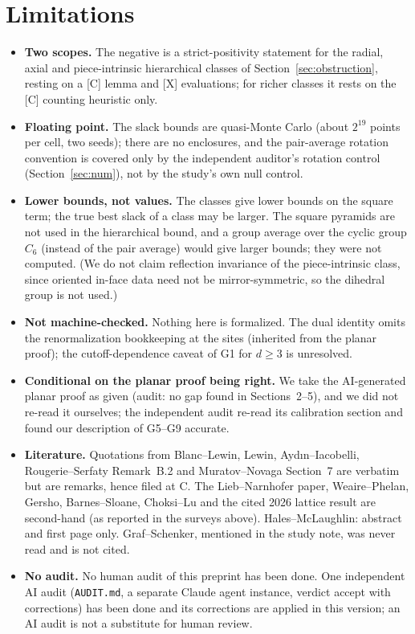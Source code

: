 \documentclass[10pt]{article}
\newcommand{\tier}[1]{\textsf{[#1]}}
\theoremstyle{remark}
\begin{document}
\section{Limitations}
\begin{itemize}
\item \textbf{Two scopes.} The negative is a strict-positivity statement for the radial, axial and piece-intrinsic hierarchical classes of Section~\ref{sec:obstruction}, resting on a \tier{C} lemma and \tier{X} evaluations; for richer classes it rests on the \tier{C} counting heuristic only.
\item \textbf{Floating point.} The slack bounds are quasi-Monte Carlo (about $2^{19}$ points per cell, two seeds); there are no enclosures, and the pair-average rotation convention is covered only by the independent auditor's rotation control (Section~\ref{sec:num}), not by the study's own null control.
\item \textbf{Lower bounds, not values.} The classes give lower bounds on the square term; the true best slack of a class may be larger. The square pyramids are not used in the hierarchical bound, and a group average over the cyclic group $C_6$ (instead of the pair average) would give larger bounds; they were not computed. (We do not claim reflection invariance of the piece-intrinsic class, since oriented in-face data need not be mirror-symmetric, so the dihedral group is not used.)
\item \textbf{Not machine-checked.} Nothing here is formalized. The dual identity omits the renormalization bookkeeping at the sites (inherited from the planar proof); the cutoff-dependence caveat of G1 for $d\ge3$ is unresolved.
\item \textbf{Conditional on the planar proof being right.} We take the AI-generated planar proof as given (audit: no gap found in Sections~2--5), and we did not re-read it ourselves; the independent audit re-read its calibration section and found our description of G5--G9 accurate.
\item \textbf{Literature.} Quotations from Blanc--Lewin, Lewin, Aydın--Iacobelli, Rougerie--Serfaty Remark~B.2 and Muratov--Novaga Section~7 are verbatim but are remarks, hence filed at C. The Lieb--Narnhofer paper, Weaire--Phelan, Gersho, Barnes--Sloane, Choksi--Lu and the cited 2026 lattice result are second-hand (as reported in the surveys above). Hales--McLaughlin: abstract and first page only. Graf--Schenker, mentioned in the study note, was never read and is not cited.
\item \textbf{No audit.} No human audit of this preprint has been done. One independent AI audit (\texttt{AUDIT.md}, a separate Claude agent instance, verdict accept with corrections) has been done and its corrections are applied in this version; an AI audit is not a substitute for human review.
\end{itemize}
\end{document}
